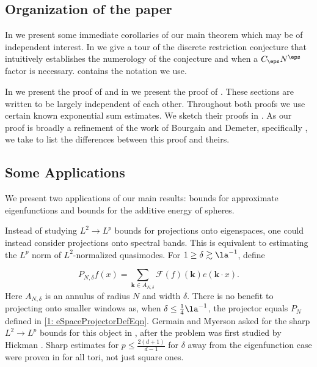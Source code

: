 \documentclass[11pt]{amsart}
\begin{document}
\subsection{Organization of the paper}
In  we present some immediate corollaries of our main theorem which may be of independent interest. In  we give a tour of the discrete restriction conjecture that intuitively establishes the numerology of the conjecture and when a $C_\eps N^\eps$ factor is necessary.  contains the notation we use.

In  we present the proof of  and in  we present the proof of . These sections are written to be largely independent of each other. Throughout both proofs we use certain known exponential sum estimates. We sketch their proofs in . As our proof is broadly a refinement of the work of Bourgain and Demeter, specifically \cite{bourgainDemeterDiscreteRestrictImprovements2013}, we take  to list the differences between this proof and theirs.



\subsection{Some Applications}\label{1: Subsection Applications}
We present two applications of our main results: bounds for approximate eigenfunctions and bounds for the additive energy of spheres.

Instead of studying $L^2\rightarrow L^p$ bounds for projections onto eigenspaces, one could instead consider projections onto spectral bands. This is equivalent to estimating the $L^p$ norm of $L^2$-normalized quasimodes. For $1\geq \delta \gtrsim \la^{-1}$, define

\begin{equation}\label{1: spectralProjectorDef}
    P_{N,\delta}f(x) = \sum_{\mathbf{k}\in A_{N,\delta}}\mathcal{F}(f)(\mathbf{k})e(\mathbf{k}\cdot x).
\end{equation}
Here $A_{N,\delta}$ is an annulus of radius $N$ and width $\delta$. There is no benefit to projecting onto smaller windows as, when $\delta \leq \frac{1}{4}\la^{-1}$, the projector equals $P_N$ defined in \eqref{1: eSpaceProjectorDefEqn}. Germain and Myerson asked for the sharp $L^2\rightarrow L^p$ bounds for this object in \cite{germainMyersonSpecProj2022}, after the problem was first studied by Hickman \cite{Hickman2020}. Sharp estimates for $p\leq \frac{2(d+1)}{d-1}$ for $\delta$ away from the eigenfunction case were proven in \cite{pezzi2025} for all tori, not just square ones.
\end{document}
